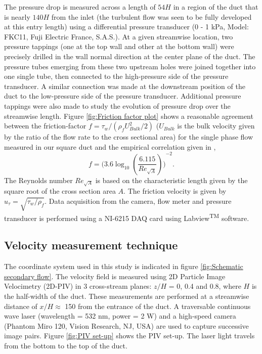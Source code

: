 \documentclass{jfm}
\begin{document}
The pressure drop is measured across a length of $54H$ in a region of the duct that is nearly $140H$ from the inlet (the turbulent flow was seen to be fully developed at this entry length) using a differential pressure transducer (0 - 1 kPa, Model: FKC11, Fuji Electric France, S.A.S.). At a given streamwise location, two pressure tappings (one at the top wall and other at the bottom wall) were precisely drilled in the wall normal direction at the center plane of the duct. The pressure tubes emerging from these two upstream holes were joined together into one single tube, then connected to the high-pressure side of the pressure transducer. A similar connection was made at the downstream position of the duct to the low-pressure side of the pressure transducer. Additional pressure tappings were also made to study the evolution of pressure drop over the streamwise length. Figure \ref{fig:Friction factor plot} shows a reasonable agreement between the friction-factor $f={\tau_w}/{(\rho_fU_{Bulk}^2/2)}$ ($U_{Bulk}$ is the bulk velocity given by the ratio of the flow rate to the cross sectional area) for the single phase flow measured in our square duct and the empirical correlation given in \cite{duan2012pressure}, 
\begin{equation}
  {f}={\Big(3.6\log_{10}(\frac{6.115}{Re_{\sqrt{A}}})\Big)}^{-2}.
  \label{eqn:Friction factor}
\end{equation}
The Reynolds number $Re_{\sqrt{A}}$ is based on the characteristic length given by the square root of the cross section area $A$. The friction velocity is given by $u_{\tau} = \sqrt{\tau_w/\rho_f}$. Data acquisition from the camera, flow meter and pressure transducer is performed using a NI-6215 DAQ card using Labview\textsuperscript{TM} software.

\subsection{Velocity measurement technique}\label{sec:Velocity measurement technique}
The coordinate system used in this study is indicated in figure \ref{fig:Schematic secondary flow}. The velocity field is measured using 2D Particle Image Velocimetry (2D-PIV) in 3 cross-stream planes: $z/H$ = 0, 0.4 and 0.8, where $H$ is the half-width of the duct. These measurements are performed at a streamwise distance of $x/H\approx$ 150 from the entrance of the duct. A traversable continuous wave laser (wavelength = 532 nm, power = 2 W) and a high-speed camera (Phantom Miro 120, Vision Research, NJ, USA) are used to capture successive image pairs. Figure \ref{fig:PIV set-up} shows the PIV set-up. The laser light travels from the bottom to the top of the duct.
\end{document}
